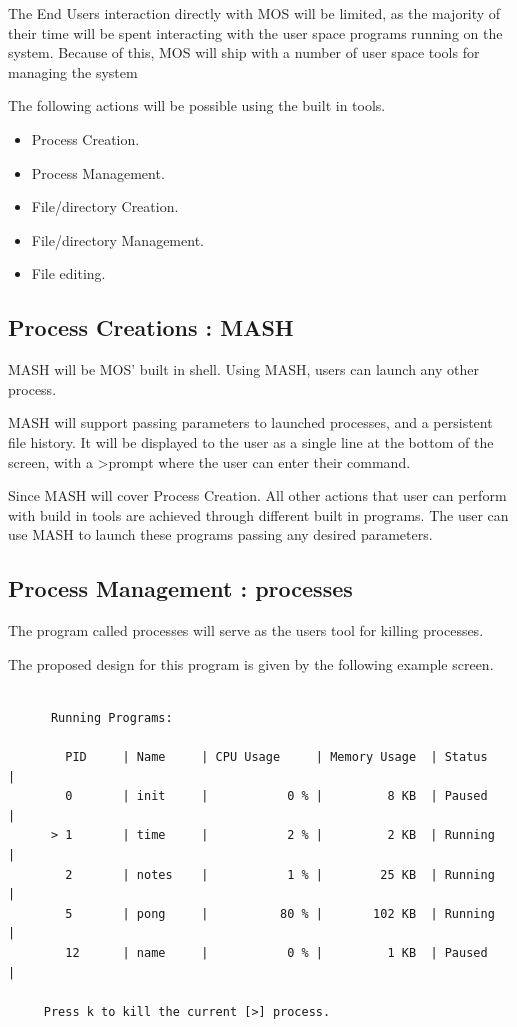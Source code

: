 \documentclass[a4paper]{report}
\begin{document}
The End Users interaction directly with MOS will be limited, as the majority of their time will be spent interacting with the user space programs running on the system. Because of this, MOS will ship with a number of user space tools for managing the system

The following actions will be possible using the built in tools.
\begin{itemize}
\item Process Creation.
\item Process Management.
\item File/directory Creation.
\item File/directory Management.
\item File editing.
\end{itemize}

\subsection {Process Creations : MASH}

MASH will be MOS' built in shell. Using MASH, users can launch any other process.

MASH will support passing parameters to launched processes, and a persistent file history. It will be displayed to the user as a single line at the bottom of the screen, with a \textgreater  prompt where the user can enter their command.

Since MASH will cover Process Creation. All other actions that user can perform with build in tools are achieved through different built in programs. The user can use MASH to launch these programs passing any desired parameters.

\subsection{Process Management : processes}

The program called processes will serve as the users tool for killing processes.

The proposed design for this program is given by the following example screen.

{\ttfamily \small
  \begin{framed}
    \begin{verbatim}

      Running Programs:

        PID     | Name     | CPU Usage     | Memory Usage  | Status     |
        0       | init     |           0 % |         8 KB  | Paused     |
      > 1       | time     |           2 % |         2 KB  | Running    |
        2       | notes    |           1 % |        25 KB  | Running    |
        5       | pong     |          80 % |       102 KB  | Running    |
        12      | name     |           0 % |         1 KB  | Paused     |

     Press k to kill the current [>] process.

    \end{verbatim}
  \end{framed}
}
\end{document}
